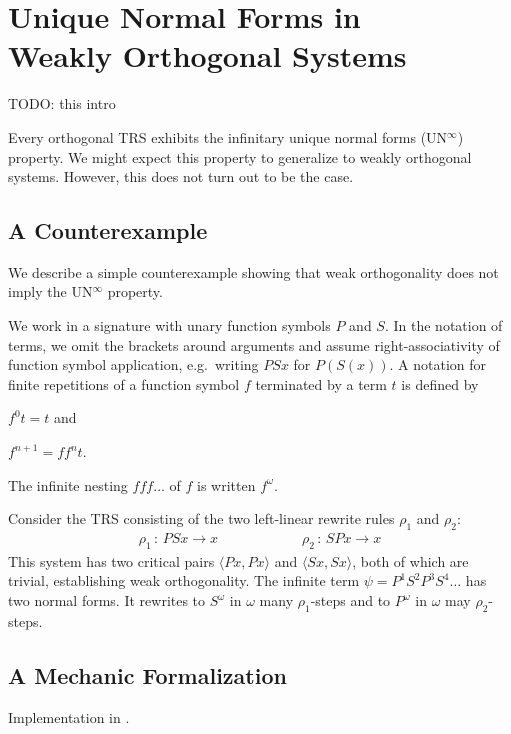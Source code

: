 \chapter[\texorpdfstring{UN$^\infty$ in Weakly Orthogonal Systems}{UN
  in Weakly Orthogonal Systems}]{\texorpdfstring{Unique Normal Forms
    in\\Weakly Orthogonal Systems}{Unique Normal Forms in Weakly
    Orthogonal Systems}}\label{chap:unwo}

TODO: this intro

Every orthogonal TRS exhibits the infinitary unique normal forms
(UN$^\infty$) property. We might expect this property to generalize to
weakly orthogonal systems. However, this does not turn out to be the
case.


\section{A Counterexample}

We describe a simple counterexample showing that weak orthogonality
does not imply the UN$^\infty$ property.

We work in a signature with unary function symbols $P$ and $S$. In the
notation of terms, we omit the brackets around arguments and assume
right-associativity of function symbol application, e.g.\ writing
$PSx$ for $P(S(x))$. A notation for finite repetitions of a function
symbol $f$ terminated by a term $t$ is defined by
\begin{inparaenum}[(i)]
\item $f^0 t = t$ and
\item $f^{n+1} = ff^nt$.
\end{inparaenum}
The infinite nesting $fff \ldots$ of $f$ is written $f^\omega$.

Consider the TRS consisting of the two left-linear rewrite rules
$\rho_1$ and $\rho_2$:
\begin{align*}
  \rho_1 \, : \, PSx \to x \qquad \qquad \qquad
  \rho_2 \, : \, SPx \to x
\end{align*}
This system has two critical pairs $\langle Px, Px \rangle$ and
$\langle Sx, Sx \rangle$, both of which are trivial, establishing
weak orthogonality. The infinite term $\psi = P^1 S^2 P^3 S^4 \ldots$
has two normal forms. It rewrites to $S^\omega$ in $\omega$ many
$\rho_1$-steps and to $P^\omega$ in $\omega$ may $\rho_2$-steps.


\section{A Mechanic Formalization}

Implementation in \Coq.
